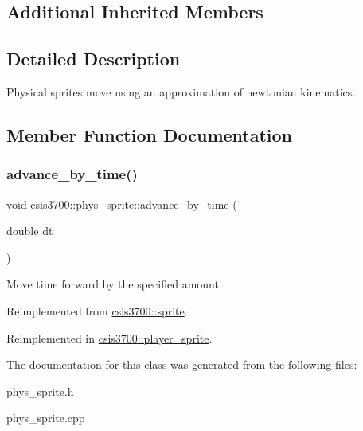 \subsection*{Additional Inherited Members}


\subsection{Detailed Description}
Physical sprites move using an approximation of newtonian kinematics. 

\subsection{Member Function Documentation}
\mbox{\label{classcsis3700_1_1phys__sprite_a3bb24599b1bc2fd13846826308914db4}} 
\subsubsection{\texorpdfstring{advance\+\_\+by\+\_\+time()}{advance\_by\_time()}}
{\footnotesize\ttfamily void csis3700\+::phys\+\_\+sprite\+::advance\+\_\+by\+\_\+time (\begin{DoxyParamCaption}\item[{double}]{dt }\end{DoxyParamCaption})\hspace{0.3cm}{\ttfamily [virtual]}}

Move time forward by the specified amount 

Reimplemented from \hyperlink{classcsis3700_1_1sprite_ac4d932bda87ce98a36579de3e1392a8f}{csis3700\+::sprite}.



Reimplemented in \hyperlink{classcsis3700_1_1player__sprite_ac2453e0b3934ac639d704c4ecca7493d}{csis3700\+::player\+\_\+sprite}.



The documentation for this class was generated from the following files\+:\begin{DoxyCompactItemize}
\item 
phys\+\_\+sprite.\+h\item 
phys\+\_\+sprite.\+cpp\end{DoxyCompactItemize}
